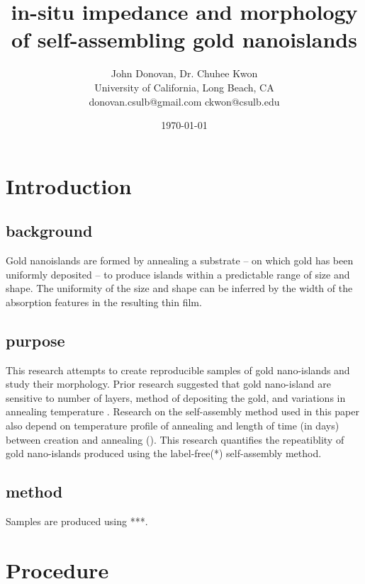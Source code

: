 \documentclass[12pt,oneside,english]{article}
\begin{document}
\sffamily

        \title{in-situ impedance and morphology of self-assembling gold nanoislands}

	\author{John Donovan, Dr. Chuhee Kwon\\
	University of California, Long Beach, CA\\
	{\small donovan.csulb@gmail.com ckwon@csulb.edu}}
	
        \date{\today}

	\maketitle


        \section{Introduction}
	\subsection{background}
	Gold nanoislands  are formed by annealing a substrate -- on which gold has been uniformly deposited -- to produce islands within a predictable range of size and shape.
	The uniformity of the size and shape can be inferred by the width of the absorption features in the resulting thin film.
	\subsection{purpose}
	This research attempts to create reproducible samples of gold nano-islands and study their morphology.
	Prior research suggested that gold nano-island are sensitive to number of layers, method of depositing the gold, and variations in annealing temperature \cite{shon07}.
	Research on the self-assembly method used in this paper also depend on temperature profile of annealing and length of time (in days) between creation and annealing (\cite{joshi}).
	This research quantifies the repeatiblity of gold nano-islands produced using the label-free(*) self-assembly method.
	\subsection{method}
	Samples are produced using ***.

	\section{Procedure}
\end{document}
